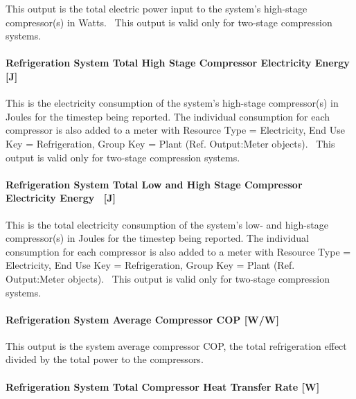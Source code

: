 This output is the total electric power input to the system's high-stage compressor(s) in Watts.~ This output is valid only for two-stage compression systems.

\paragraph{Refrigeration System Total High Stage Compressor Electricity Energy {[}J{]}}\label{refrigeration-system-total-high-stage-compressor-electric-energy-j}

This is the electricity consumption of the system's high-stage compressor(s) in Joules for the timestep being reported. The individual consumption for each compressor is also added to a meter with Resource Type = Electricity, End Use Key = Refrigeration, Group Key = Plant (Ref. Output:Meter objects).~ This output is valid only for two-stage compression systems.

\paragraph{Refrigeration System Total Low and High Stage Compressor Electricity Energy~ {[}J{]}}\label{refrigeration-system-total-low-and-high-stage-compressor-electric-energy-j}

This is the total electricity consumption of the system's low- and high-stage compressor(s) in Joules for the timestep being reported. The individual consumption for each compressor is also added to a meter with Resource Type = Electricity, End Use Key = Refrigeration, Group Key = Plant (Ref. Output:Meter objects).~ This output is valid only for two-stage compression systems.

\paragraph{Refrigeration System Average Compressor COP {[}W/W{]}}\label{refrigeration-system-average-compressor-cop-ww}

This output is the system average compressor COP, the total refrigeration effect divided by the total power to the compressors.

\paragraph{Refrigeration System Total Compressor Heat Transfer Rate {[}W{]}}\label{refrigeration-system-total-compressor-heat-transfer-rate-w}

